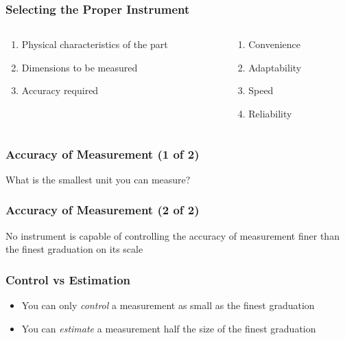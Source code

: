 \begin{frame}
	\frametitle{Selecting the Proper Instrument}

    \begin{columns}
        \begin{column}{0.48\linewidth}
            \begin{enumerate}[<+- | alert@+>]
                \item<1->[1.] Physical characteristics of the part
                \item<2->[2.] Dimensions to be measured
                \item<3->[3.] Accuracy required
            \end{enumerate}   
        \end{column}
        \begin{column}{0.48\linewidth}
            \begin{enumerate}[<+- | alert@+>]
                \item<4->[4.] Convenience
                \item<5->[5.] Adaptability
                \item<6->[6.] Speed
                \item<7->[7.] Reliability
            \end{enumerate}             
        \end{column}
    \end{columns}
         
\end{frame}

\begin{frame}
	\frametitle{Accuracy of Measurement (1 of 2)}
    \centering
    What is the smallest unit you can measure?
\end{frame}

\begin{frame}
	\frametitle{Accuracy of Measurement (2 of 2)}
    \centering
    No instrument is capable of controlling the accuracy of measurement finer than the finest graduation on its scale
\end{frame}

\begin{frame}
	\frametitle{Control vs Estimation}
    \begin{itemize}[<+- | alert@+>]
        \item{You can only \emph{control} a measurement as small as the finest graduation}
        \item{You can \emph{estimate} a measurement half the size of the finest graduation}
    \end{itemize}  
\end{frame}

